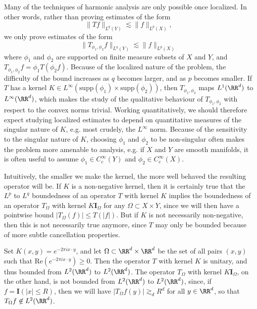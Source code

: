 Many of the techniques of harmonic analysis are only possible once localized. In other words, rather than proving estimates of the form
%
\[ \| Tf \|_{L^q(Y)} \lesssim \| f \|_{L^p(X)}, \]
%
we only prove estimates of the form
%
\[ \| T_{\phi_1, \phi_2} f \|_{L^q(Y)} \lesssim \| f \|_{L^p(X)} \]
%
where $\phi_1$ and $\phi_2$ are supported on finite measure subsets of $X$ and $Y$, and $T_{\phi_1, \phi_2} f = \phi_1 T(\phi_2 f)$. Because of the localized nature of the problem, the difficulty of the bound increases as $q$ becomes larger, and as $p$ becomes smaller. If $T$ has a kernel $K \in L^\infty(\text{supp}(\phi_1) \times \text{supp}(\phi_2))$, then $T_{\phi_1, \phi_2}$ maps $L^1(\RR^d)$ to $L^\infty(\RR^d)$, which makes the study of the qualitative behaviour of $T_{\phi_1, \phi_2}$ with respect to the convex norms trivial. Working quantitatively, we should therefore expect studying localized estimates to depend on quantitative measures of the singular nature of $K$, e.g. most crudely, the $L^\infty$ norm. Because of the sensitivity to the singular nature of $K$, choosing $\phi_1$ and $\phi_2$ to be non-singular often makes the problem more amenable to analysis, e.g. if $X$ and $Y$ are smooth manifolds, it is often useful to assume $\phi_1 \in C_c^\infty(Y)$ and $\phi_2 \in C_c^\infty(X)$.

Intuitively, the smaller we make the kernel, the more well behaved the resulting operator will be. If $K$ is a non-negative kernel, then it is certainly true that the $L^p$ to $L^q$ boundedness of an operator $T$ with kernel $K$ implies the boundedness of an operator $T_\Omega$ with kernel $K \mathbf{I}_\Omega$ for any $\Omega \subset X \times Y$, since we will then have a pointwise bound $|T_\Omega(f)| \leq T(|f|)$. But if $K$ is not necessarily non-negative, then this is not necessarily true anymore, since $T$ may only be bounded because of more subtle cancellation properties.

\begin{example}
    Set $K(x,y) = e^{-2 \pi i x \cdot y}$, and let $\Omega \subset \RR^d \times \RR^d$ be the set of all pairs $(x,y)$ such that $\text{Re}(e^{- 2 \pi i x \cdot y}) \geq 0$. Then the operator $T$ with kernel $K$ is unitary, and thus bounded from $L^2(\RR^d)$ to $L^2(\RR^d)$. The operator $T_\Omega$ with kernel $K \mathbf{I}_\Omega$, on the other hand, is not bounded from $L^2(\RR^d)$ to $L^2(\RR^d)$, since, if $f = \mathbf{I}(|x| \leq R)$, then we will have $|T_\Omega f(y)| \gtrsim_d R^d$ for all $y \in \RR^d$, so that $T_\Omega f \not \in L^2(\RR^d)$.
\end{example}


